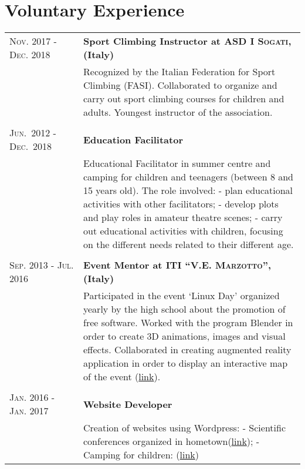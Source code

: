 \documentclass[a4paper,10pt]{article}
\begin{document}
\section{Voluntary Experience}
\begin{tabular}{m{0.25\linewidth}|p{0.75\linewidth}}
  \textsc{Nov. 2017 - Dec. 2018} &\textbf{Sport Climbing Instructor at \textsc{ASD I Sogati}, (Italy)}\\
  &  Recognized by the Italian Federation for Sport Climbing (FASI). Collaborated to organize and carry out sport climbing courses for children and adults. Youngest instructor of the association.\\

   \\

  \textsc{Jun.~2012 - Dec.~2018} &
  \textbf{Education Facilitator} \\
  & Educational Facilitator in summer centre and camping for children and teenagers (between 8 and 15 years old). The role involved: - plan educational activities with other facilitators; - develop plots and play roles in amateur theatre scenes; - carry out educational activities with children, focusing on the different needs related to their different age.\\

   \\
  
  \textsc{Sep. 2013 - Jul. 2016} &
  \textbf{Event Mentor at \textsc{ITI “V.E. Marzotto”}, (Italy)}\\
  & Participated in the event `Linux Day' organized yearly by the high school about the promotion of free software. Worked with the program Blender in order to create 3D animations, images and visual effects. Collaborated in creating augmented reality application in order to display an interactive map of the event (\href{https://play.google.com/store/apps/details?id=it.itismarzotto.armaps&hl=it}{link}).\\
  
   \\

  \textsc{Jan. 2016 - Jan. 2017}& \textbf{Website Developer} \\
  & Creation of websites using Wordpress:
  - Scientific conferences organized in hometown(\href{http://laviadellescienze.altervista.org/}{link}); - Camping for children: (\href{http://campomaglio.altervista.org/}{link})\\
\end{tabular}
\end{document}
